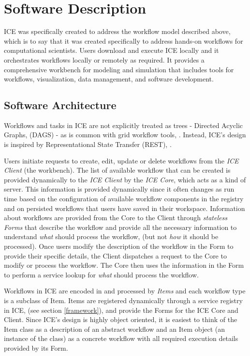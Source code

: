 \section{Software Description}\label{software-description}

ICE was specifically created to address the workflow model described
above, which is to say that it was created specifically to address
hands-on workflows for computational scientists. Users download and
execute ICE locally and it orchestrates workflows locally or remotely as
required. It provides a comprehensive workbench for modeling and
simulation that includes tools for workflows, visualization, data
management, and software development.

\subsection{Software Architecture}\label{software-architecture}

Workflows and tasks in ICE are not explicitly treated as trees -
Directed Acyclic Graphs, (DAGS) - as is common with grid workflow tools,
\cite{yu_taxonomy_2005}. Instead, ICE's design is inspired by Representational
State Transfer (REST), \cite{fielding_architectural_2000}.

Users initiate requests to create, edit, update or delete workflows from
the \emph{ICE Client} (the workbench). The list of available workflow
that can be created is provided dynamically to the \emph{ICE Client} by
the \emph{ICE Core}, which acts as a kind of server. This information is
provided dynamically since it often changes as run time based on the
configuration of available workflow components in the registry and on
persisted workflows that users have saved in their workspace.
Information about workflows are provided from the Core to the Client
through \emph{stateless Forms} that describe the workflow and provide
all the necessary information to understand \emph{what} should process
the workflow, (but not \emph{how} it should be processed). Once users
modify the description of the workflow in the Form to provide their
specific details, the Client dispatches a request to the Core to modify
or process the workflow. The Core then uses the information in the Form
to perform a service lookup for \emph{what} should process the workflow.

Workflows in ICE are encoded in and processed by \emph{Items} and each
workflow type is a subclass of Item. Items are registered dynamically
through a service registry in ICE, (see section \ref{framework}), and
provide the Forms for the ICE Core and Client. Since ICE's design is
highly object oriented, it is easiest to think of the Item class as a
description of an abstract workflow and an Item object (an instance of
the class) as a concrete workflow with all required execution details
provided by its Form.

